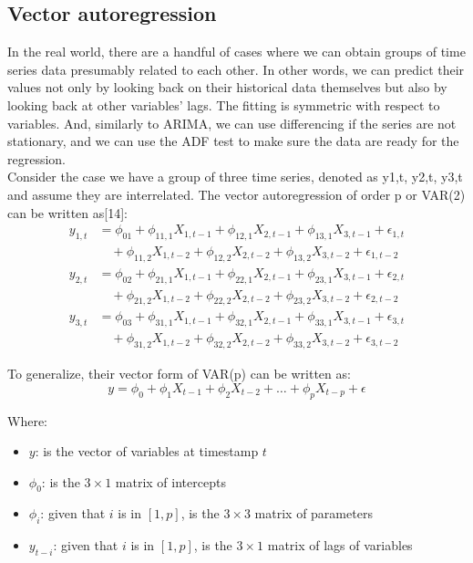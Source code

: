 \documentclass{ieeeojies}
\begin{document}
\subsection{Vector autoregression}
In the real world, there are a handful of cases where we can obtain groups of time series data presumably related to each other. In other words, we can predict their values not only by looking back on their historical data themselves but also by looking back at other variables’ lags. The fitting is symmetric with respect to variables. And, similarly to ARIMA, we can use differencing if the series are not stationary, and we can use the ADF test to make sure the data are ready for the regression.\\
Consider the case we have a group of three time series, denoted as y1,t, y2,t, y3,t and assume they are interrelated. The vector autoregression of order p or VAR(2) can be written as[14]:
\[
\begin{aligned}
y_{1,t} &= \phi_{01} + \phi_{11,1} X_{1,t-1} + \phi_{12,1} X_{2,t-1} + \phi_{13,1} X_{3,t-1} + \epsilon_{1,t} \\
&\quad + \phi_{11,2} X_{1,t-2} + \phi_{12,2} X_{2,t-2} + \phi_{13,2} X_{3,t-2} + \epsilon_{1,t-2} \\
y_{2,t} &= \phi_{02} + \phi_{21,1} X_{1,t-1} + \phi_{22,1} X_{2,t-1} + \phi_{23,1} X_{3,t-1} + \epsilon_{2,t} \\
&\quad + \phi_{21,2} X_{1,t-2} + \phi_{22,2} X_{2,t-2} + \phi_{23,2} X_{3,t-2} + \epsilon_{2,t-2} \\
y_{3,t} &= \phi_{03} + \phi_{31,1} X_{1,t-1} + \phi_{32,1} X_{2,t-1} + \phi_{33,1} X_{3,t-1} + \epsilon_{3,t} \\
&\quad + \phi_{31,2} X_{1,t-2} + \phi_{32,2} X_{2,t-2} + \phi_{33,2} X_{3,t-2} + \epsilon_{3,t-2}
\end{aligned}
\]

To generalize, their vector form of VAR(p) can be written as:
\[
y = \phi_0 + \phi_1 X_{t-1} + \phi_2 X_{t-2} + \ldots + \phi_p X_{t-p} + \epsilon
\]

Where:
\begin{itemize}
    \item \( y \): is the vector of variables at timestamp \( t \)
    \item \( \phi_0 \): is the \( 3 \times 1 \) matrix of intercepts
    \item \( \phi_i \): given that \( i \) is in \( [1, p] \), is the \( 3 \times 3 \) matrix of parameters
    \item \( y_{t-i} \): given that \( i \) is in \( [1, p] \), is the \( 3 \times 1 \) matrix of lags of variables
\end{itemize}
\end{document}
